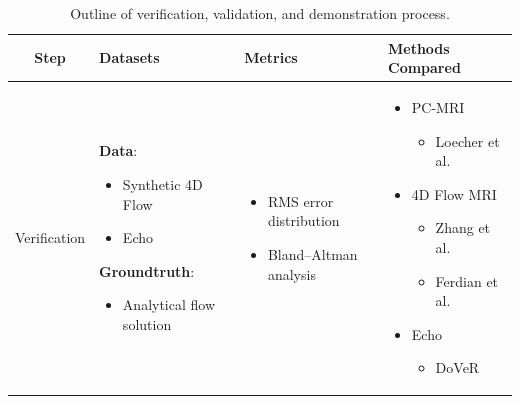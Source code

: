 \begin{table}[!h]
\scriptsize
    \centering
    \caption{Outline of verification, validation, and demonstration process.}
    \label{table:datasets}
    \begin{tabularx}{\textwidth}{c | X | X | X}
        \toprule
        \textbf{Step} & \textbf{Datasets} & \textbf{Metrics} &  \textbf{Methods Compared} \\
        \midrule
        \multirow{8}{*}[2ex]{\centering Verification} & 
        \textbf{Data}:
        \begin{itemize}[left=0em]
            \item Synthetic 4D Flow
            \item Echo
        \end{itemize}
        \textbf{Groundtruth}:
        \begin{itemize}[left=0em]
            \item Analytical flow solution
        \end{itemize} & 
        \begin{itemize}[left=0em]
            \item RMS error distribution
            \item Bland–Altman analysis
        \end{itemize} & 
        \multirow{32}{*}[16ex]{%
            \begin{minipage}{.25\textwidth}
                \begin{itemize}[left=0em]
                    \item PC-MRI
                        \begin{itemize}
                            \item Loecher et al. \cite{loecher2018_PCMRI}
                        \end{itemize}
                    \item 4D Flow MRI
                        \begin{itemize}
                            \item Zhang et al. \cite{zhang2022_4Dsparserep, zhang2019_4Dpressure, zhang2022_4DWSS}
                            \item Ferdian et al. \cite{Ferdien2020_4DFlowNN}
                        \end{itemize}
                    \item Echo
                        \begin{itemize}
                            \item DoVeR \cite{brett2020_echo}

\end{itemize}
\end{itemize}
\end{minipage}}
\end{tabularx}
\end{table}

